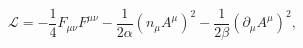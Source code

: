 \begin{equation}
\mathcal{L}=-\frac{1}{4}F_{\mu \nu }F^{\mu \nu }-\frac{1}{2\alpha }\left(
n_{\mu }A^{\mu }\right) ^{2}-\frac{1}{2\beta }\left( \partial _{\mu }A^{\mu
}\right) ^{2},  \label{lag}
\end{equation}

